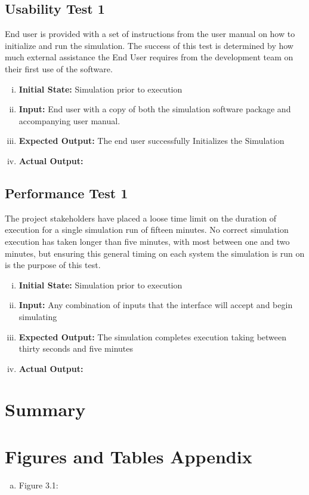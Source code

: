 \documentclass[paper=letter, fontsize=10pt]{scrartcl}
\numberwithin{equation}{section}		%
\numberwithin{figure}{section}			%
\numberwithin{table}{section}				%
\begin{document}
\subsection{Usability Test 1}
End user is provided with a set of instructions from the user manual on how to initialize and run the simulation. The success of this test is determined by how much external assistance the End User requires from the development team on their first use of the software. 
\begin{enumerate}[(i)]
	\item \textbf{Initial State:} Simulation prior to execution
	\item \textbf{Input:} End user with a copy of both the simulation software package and accompanying user manual.
	\item \textbf{Expected Output:} The end user successfully Initializes the Simulation
	\item \textbf{Actual Output:}
\end{enumerate}

\subsection{Performance Test 1}
The project stakeholders have placed a loose time limit on the duration of execution for a single simulation run of fifteen minutes. No correct simulation execution has taken longer than five minutes, with most between one and two minutes, but ensuring this general timing on each system the simulation is run on is the purpose of this test.
\begin{enumerate}[(i)]
	\item \textbf{Initial State:} Simulation prior to execution 
	\item \textbf{Input:} Any combination of inputs that the interface will accept and begin simulating
	\item \textbf{Expected Output:} The simulation completes execution taking between thirty seconds and five minutes 
	\item \textbf{Actual Output:}
\end{enumerate}

\section{Summary}

\section{Figures and Tables Appendix}
\begin{enumerate}[(a)]
	\item Figure 3.1: 
\end{enumerate}

\end{document}
